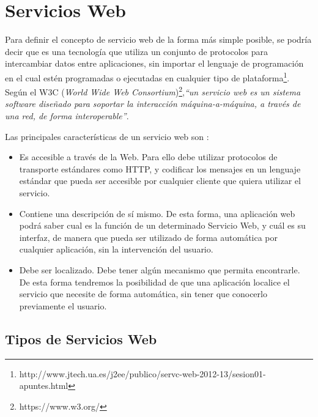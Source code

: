 \section{Servicios Web}
\label{cap:sec:serviciosweb}

Para definir el concepto de servicio web de la forma más simple posible, se podría decir que es una tecnología que utiliza un conjunto de protocolos para intercambiar datos entre aplicaciones, sin importar el lenguaje de programación en el cual estén programadas o ejecutadas en cualquier tipo de plataforma\footnote{http://www.jtech.ua.es/j2ee/publico/servc-web-2012-13/sesion01-apuntes.html}. Según el W3C (\textit{World Wide Web Consortium})\footnote{https://www.w3.org/},\textit{``un servicio web es un sistema software diseñado para soportar la interacción máquina-a-máquina, a través de una red, de forma interoperable''}.




Las principales características de un servicio web son \citep{TorresJoaquin2017SC}:



\begin{itemize}
	\item Es accesible a través de la Web. Para ello debe utilizar protocolos de transporte estándares como HTTP, y codificar los mensajes en un lenguaje estándar que pueda ser accesible por cualquier cliente que quiera utilizar el servicio. 
	\item Contiene una descripción de sí mismo. De esta forma, una aplicación web podrá saber cual es la función de un determinado Servicio Web, y cuál es su interfaz, de manera que pueda ser utilizado de forma automática por cualquier aplicación, sin la intervención del usuario.
	\item Debe ser localizado. Debe tener algún mecanismo que permita encontrarle. De esta forma tendremos la posibilidad de que una aplicación localice el servicio que necesite de forma automática, sin tener que conocerlo previamente el usuario.
\end{itemize}

\subsection{Tipos de Servicios Web}
\label{cap:subsec:tiposserviciosweb}

